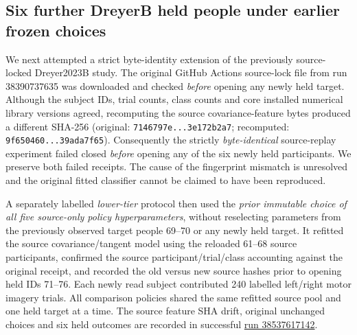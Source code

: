 \subsection{Six further DreyerB held people under earlier frozen choices}
\label{sec:p3-dreyerb-six-new}
We next attempted a strict byte-identity extension of
the previously source-locked Dreyer2023B study.
The original GitHub Actions source-lock file from
run 38390737635 was downloaded and checked
\emph{before} opening any newly held target.
Although the subject IDs, trial counts, class
counts and core installed numerical library
versions agreed, recomputing the source
covariance-feature bytes produced a different
SHA-256 (original:
\texttt{7146797e...3e172b2a7};
recomputed:
\texttt{9f650460...39ada7f65}).
Consequently the strictly \emph{byte-identical}
source-replay experiment failed closed
\emph{before} opening any of the six newly
held participants. We preserve both failed
receipts. The cause of the fingerprint mismatch
is unresolved and the original fitted
classifier cannot be claimed to have
been reproduced.

A separately labelled \emph{lower-tier} protocol
then used the \emph{prior immutable choice of all
five source-only policy hyperparameters},
without reselecting parameters from the
previously observed target people 69--70
or any newly held target. It refitted the
source covariance/tangent model using the
reloaded 61--68 source participants, confirmed
the source participant/trial/class accounting
against the original receipt, and recorded the
old versus new source hashes prior to opening
held IDs 71--76. Each newly read subject
contributed 240 labelled left/right motor
imagery trials. All comparison policies
shared the same refitted source pool and
one held target at a time. The source
feature SHA drift, original unchanged
choices and six held outcomes are recorded
in successful
\href{https://github.com/lindicaphxag-tech/kaggle/actions/runs/38537617142}
{run 38537617142}.

